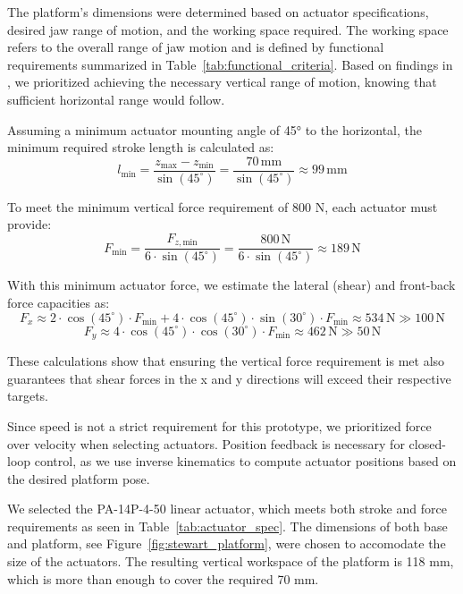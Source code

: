 The platform's dimensions were determined based on actuator specifications, desired jaw range of motion, and the working space required. The working space 
refers to the overall range of jaw motion and is defined by functional requirements summarized in Table~\ref{tab:functional_criteria}. Based on findings 
in \cite{StewartPlatformWorkspace}, we prioritized achieving the necessary vertical range of motion, knowing that sufficient horizontal range would follow.

Assuming a minimum actuator mounting angle of 45° to the horizontal, the minimum required stroke length is calculated as:
\begin{equation}
l_{\text{min}} = \frac{z_{\text{max}} - z_{\text{min}}}{\sin(45^\circ)} = \frac{70\,\text{mm}}{\sin(45^\circ)} \approx 99\,\text{mm}
\end{equation}

To meet the minimum vertical force requirement of 800 N, each actuator must provide:
\begin{equation}
F_{\text{min}} = \frac{F_{z,\text{min}}}{6 \cdot \sin(45^\circ)} = \frac{800\,\text{N}}{6 \cdot \sin(45^\circ)} \approx 189\,\text{N}
\end{equation}

With this minimum actuator force, we estimate the lateral (shear) and front-back force capacities as:
\begin{equation}
F_{x} \approx 2 \cdot \cos(45^\circ) \cdot F_{\text{min}} + 4 \cdot \cos(45^\circ) \cdot \sin(30^\circ) \cdot F_{\text{min}} \approx 534\,\text{N} \gg 100\,\text{N}
\end{equation}
\begin{equation}
F_{y} \approx 4 \cdot \cos(45^\circ) \cdot \cos(30^\circ) \cdot F_{\text{min}} \approx 462\,\text{N} \gg 50\,\text{N}
\end{equation}

These calculations show that ensuring the vertical force requirement is met also guarantees that shear forces in the x and y directions will exceed 
their respective targets.

Since speed is not a strict requirement for this prototype, we prioritized force over velocity when selecting actuators. Position feedback is necessary 
for closed-loop control, as we use inverse kinematics to compute actuator positions based on the desired platform pose.

We selected the PA-14P-4-50 linear actuator, which meets both stroke and force requirements as seen in Table~\ref{tab:actuator_spec}. The dimensions 
of both base and platform, see Figure~\ref{fig:stewart_platform}, were chosen to accomodate the size of the actuators. The resulting vertical workspace 
of the platform is 118 mm, which is more than enough to cover the required 70 mm.

